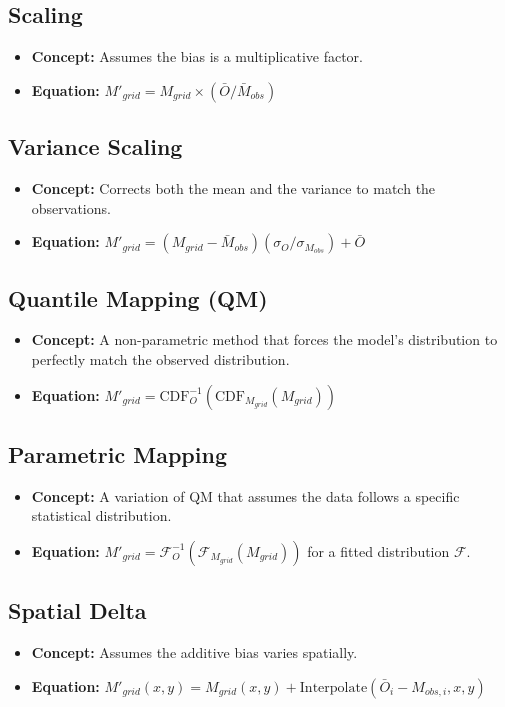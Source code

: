 \documentclass[11pt, a4paper]{article}
\begin{document}
\subsection{Scaling}
\begin{itemize}
    \item \textbf{Concept:} Assumes the bias is a multiplicative factor.
    \item \textbf{Equation:} $M'_{grid} = M_{grid} \times (\bar{O} / \bar{M}_{obs})$
\end{itemize}

\subsection{Variance Scaling}
\begin{itemize}
    \item \textbf{Concept:} Corrects both the mean and the variance to match the observations.
    \item \textbf{Equation:} $M'_{grid} = (M_{grid} - \bar{M}_{obs}) (\sigma_{O} / \sigma_{M_{obs}}) + \bar{O}$
\end{itemize}

\subsection{Quantile Mapping (QM)}
\begin{itemize}
    \item \textbf{Concept:} A non-parametric method that forces the model's distribution to perfectly match the observed distribution.
    \item \textbf{Equation:} $M'_{grid} = \text{CDF}_{O}^{-1} (\text{CDF}_{M_{grid}}(M_{grid}))$
\end{itemize}

\subsection{Parametric Mapping}
\begin{itemize}
    \item \textbf{Concept:} A variation of QM that assumes the data follows a specific statistical distribution.
    \item \textbf{Equation:} $M'_{grid} = \mathcal{F}_{O}^{-1} (\mathcal{F}_{M_{grid}}(M_{grid}))$ for a fitted distribution $\mathcal{F}$.
\end{itemize}

\subsection{Spatial Delta}
\begin{itemize}
    \item \textbf{Concept:} Assumes the additive bias varies spatially.
    \item \textbf{Equation:} $M'_{grid}(x,y) = M_{grid}(x,y) + \text{Interpolate}(\bar{O}_i - M_{obs,i}, x, y)$
\end{itemize}
\end{document}
